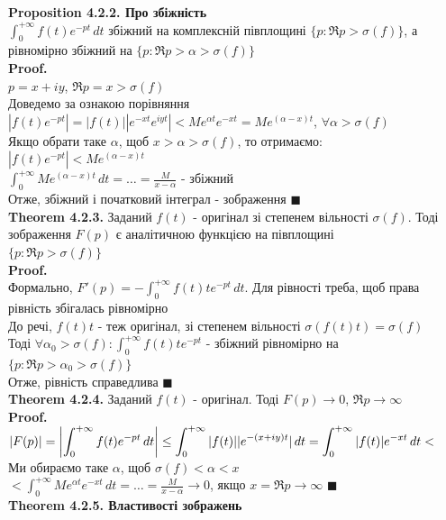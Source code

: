 \documentclass[a4paper, 10pt]{article}
\def\hugespace{\vspace{5mm} \\}
\theoremstyle{theoremdd}
\theoremstyle{theoremdd}
\theoremstyle{theoremdd}
\theoremstyle{theoremdd}
\theoremstyle{theoremdd}
\theoremstyle{theoremdd}
\theoremstyle{theoremdd}
\theoremstyle{theoremdd}
\begin{document}
\textbf{Proposition 4.2.2. Про збіжність}\\
$\displaystyle \int_0^{+\infty} f(t)e^{-pt}\,dt$ збіжний на комплексній півплощині $\{p: \Re p>\sigma(f)\}$, а рівномірно збіжний на $\{p: \Re p>\alpha>\sigma(f)\}$\\
\textbf{Proof.}\\
$p = x + iy$, $\Re p = x > \sigma(f)$\\
Доведемо за ознакою порівняння\\
$|f(t)e^{-pt}| = |f(t)| |e^{-xt}e^{iyt}| < Me^{\alpha t} e^{-xt} = Me^{(\alpha - x)t}$, $\forall \alpha > \sigma(f)$\\
Якщо обрати таке $\alpha$, щоб $x>\alpha>\sigma(f)$, то отримаємо:\\
$|f(t)e^{-pt}| < Me^{(\alpha-x)t}$\\
$\displaystyle \int_0^{+\infty} Me^{(\alpha-x)t}\,dt = \dots = \frac{M}{x-\alpha}$ - збіжний\\
Отже, збіжний і початковий інтеграл - зображення $\blacksquare$
\hugespace
\textbf{Theorem 4.2.3.} Заданий $f(t)$ - оригінал зі степенем вільності $\sigma(f)$. Тоді зображення $F(p)$ є аналітичною функцією на півплощині \\ $\{p: \Re p>\sigma(f)\}$\\
\textbf{Proof.}\\
Формально, $F'(p) = \displaystyle -\int_0^{+\infty} f(t) t e^{-pt}\,dt$. Для рівності треба, щоб права рівність збігалась рівномірно\\
До речі, $f(t)t$ - теж оригінал, зі степенем вільності $\sigma(f(t)t)=\sigma(f)$\\
Тоді $\forall \alpha_0 > \sigma(f): \displaystyle \int_0^{+\infty} f(t)te^{-pt}$ - збіжний рівномірно на $\{p: \Re p > \alpha_0 > \sigma(f) \}$\\
Отже, рівність справедлива $\blacksquare$
\hugespace
\textbf{Theorem 4.2.4.} Заданий $f(t)$ - оригінал. Тоді $F(p) \to 0$, $\Re p \to \infty$\\
\textbf{Proof.}\\
$|F(p)| = \displaystyle \abs{\int_0^{+\infty} f(t)e^{-pt}\,dt} \leq \int_0^{+\infty} |f(t)| |e^{-(x+iy)t}| \,dt = \int_0^{+\infty} |f(t)|e^{-xt}\,dt <$\\
Ми обираємо таке $\alpha$, щоб $\sigma(f) < \alpha < x$\\
$< \displaystyle \int_0^{+\infty} Me^{\alpha t} e^{-xt}\,dt = \dots = \frac{M}{x-\alpha} \to 0$, якщо $x = \Re p \to \infty$ $\blacksquare$
\hugespace
\textbf{Theorem 4.2.5. Властивості зображень}\\
\end{document}
